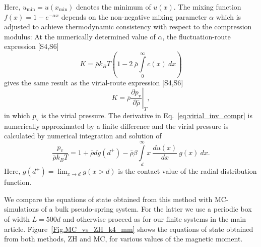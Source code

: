 \documentclass[aps,pre,twocolumn,superscriptaddress,nofootinbib]{revtex4}
\begin{document}
% 
Here, $u_\textrm{min} = u(x_\textrm{min})$ denotes the minimum of $u(x)$.
The mixing function $f(x) = 1 - e^{-\alpha x}$ depends on the non-negative mixing parameter $\alpha$
which is adjusted to achieve thermodynamic consistency with respect to the compression modulus:
At the numerically determined value of $\alpha$, the fluctuation-route expression [S4,S6]
%
\begin{equation}\label{eq:fluct_inv_compr}
K = \bar{\rho} k_B T \left( 1 - 2 ~ \bar{\rho} \int\limits_0^\infty c(x)~dx \right) 
\end{equation}
%
gives the same result as the virial-route expression [S4,S6]
%
\begin{equation}\label{eq:virial_inv_compr}
K = \bar{\rho} {\left. \dfrac{\partial p_\textrm{v}}{\partial \bar{\rho}} \right|}_{T},
\end{equation}
% 
in which $p_\textrm{v}$ is the virial pressure.
The derivative in Eq.~\eqref{eq:virial_inv_compr} is numerically approximated by a finite difference 
and the virial pressure is calculated by numerical integration and solution of
%
\begin{equation}\label{eq:virial_pressure}
\dfrac{p_\textrm{v}}{\bar{\rho} k_B T}  = 1 + \bar{\rho} d g(d^{+}) - \bar{\rho} \beta \int\limits_{d}^{\infty} x  ~ \dfrac{d u(x)}{dx} ~ g(x) ~ dx. 
\end{equation}
%
Here, $g(d^{+}) = \lim_{x \to d} g(x > d)$ is the contact value of the radial distribution function. 

We compare the equations of state obtained from this method with MC-simulations of a bulk pseudo-spring system.
For the latter we use a periodic box of width $L = 500d$ and otherwise proceed as for our finite systems in the main article. 
Figure~\ref{Fig.MC_vs_ZH_k4_mm} shows the equations of state obtained from both methods, ZH and MC, for various values of the magnetic moment.
\end{document}
